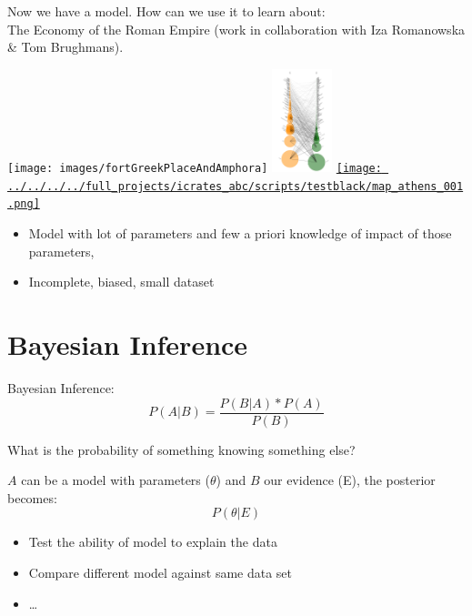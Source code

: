 \documentclass[10pt, notes=show]{beamer}
\begin{document}
\begin{frame}
    Now we have a model. How can we use it to learn about:\\
    The Economy of the Roman Empire (work in collaboration with Iza Romanowska \& Tom Brughmans).

		\texttt{[image: images/fortGreekPlaceAndAmphora]} \hfill
		\includegraphics[height=3cm]{images/netrot.pdf} \hfill
        \href{run:../../../../full_projects/icrates_abc/scripts/athens.mpg?onclick&loop}{\texttt{[image: ../../../../full\_projects/icrates\_abc/scripts/testblack/map\_athens\_001.png]}} 

    \begin{itemize}
        \item Model with lot of parameters and few a priori knowledge of impact of those parameters,  
        \item  Incomplete, biased, small dataset
    \end{itemize}
    
\end{frame}

\section{Bayesian Inference}

\begin{frame}{Bayesian Inference:}
    $$P(A|B)=\frac{P(B|A)*P(A)}{P(B)}$$
        \begin{center}
            \large
            What is the probability of something knowing something else?
        \end{center}
      $A$ can be a model with parameters ($\theta$) and $B$ our evidence (E), the posterior becomes: 
      $$P(\theta|E)$$

      \begin{itemize}
          \item Test the ability of model to explain the data
          \item Compare different model against same data set
          \item \ldots
      \end{itemize}

\end{frame}
\end{document}
